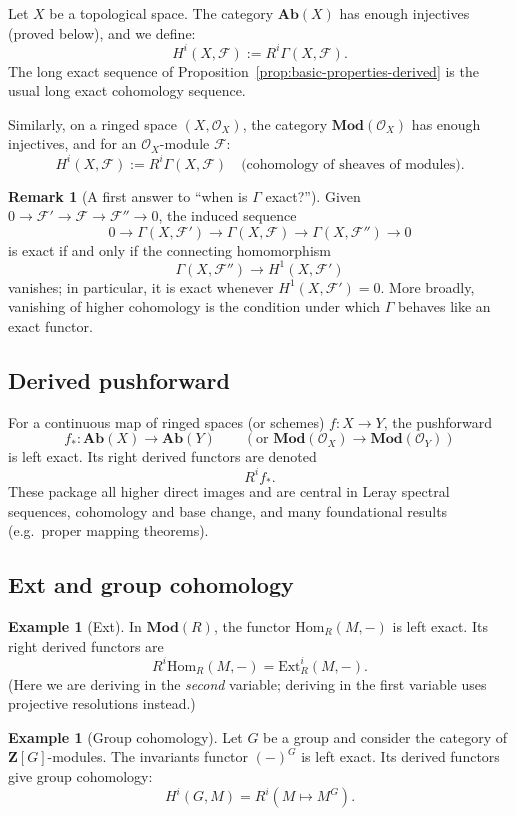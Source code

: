\documentclass[11pt]{article}
\theoremstyle{definition}
\newtheorem{example}[definition]{Example}
\newtheorem{remark}[definition]{Remark}
\theoremstyle{plain}
\newcommand{\Ab}{\mathbf{Ab}}
\newcommand{\Mod}{\mathbf{Mod}}
\newcommand{\Hom}{\mathrm{Hom}}
\newcommand{\Ext}{\mathrm{Ext}}
\newcommand{\OO}{\mathcal{O}}
\newcommand{\ZZ}{\mathbf{Z}}
\begin{document}
Let $X$ be a topological space. The category $\Ab(X)$ has enough injectives (proved below), and we define:
\[
H^i(X,\mathcal{F}) := R^i\Gamma(X,\mathcal{F}).
\]
The long exact sequence of Proposition~\ref{prop:basic-properties-derived} is the usual long exact cohomology sequence.

Similarly, on a ringed space $(X,\OO_X)$, the category $\Mod(\OO_X)$ has enough injectives, and for an $\OO_X$-module $\mathcal{F}$:
\[
H^i(X,\mathcal{F}) := R^i\Gamma(X,\mathcal{F})
\quad\text{(cohomology of sheaves of modules).}
\]

\begin{remark}[A first answer to ``when is $\Gamma$ exact?'']
Given $0\to \mathcal{F}'\to \mathcal{F}\to \mathcal{F}''\to 0$, the induced sequence
\[
0\to \Gamma(X,\mathcal{F}')\to \Gamma(X,\mathcal{F})\to \Gamma(X,\mathcal{F}'')\to 0
\]
is exact if and only if the connecting homomorphism
\[
\Gamma(X,\mathcal{F}'')\longrightarrow H^1(X,\mathcal{F}')
\]
vanishes; in particular, it is exact whenever $H^1(X,\mathcal{F}')=0$.
More broadly, vanishing of higher cohomology is the condition under which $\Gamma$ behaves like an exact functor.
\end{remark}

\subsection{Derived pushforward}

For a continuous map of ringed spaces (or schemes) $f:X\to Y$, the pushforward
\[
f_*:\Ab(X)\to \Ab(Y)\qquad (\text{or }\Mod(\OO_X)\to \Mod(\OO_Y))
\]
is left exact. Its right derived functors are denoted
\[
R^if_*.
\]
These package all higher direct images and are central in Leray spectral sequences, cohomology and base change, and many foundational results (e.g.\ proper mapping theorems).

\subsection{Ext and group cohomology}

\begin{example}[Ext]
In $\Mod(R)$, the functor $\Hom_R(M,-)$ is left exact. Its right derived functors are
\[
R^i\Hom_R(M,-)=\Ext_R^i(M,-).
\]
(Here we are deriving in the \emph{second} variable; deriving in the first variable uses projective resolutions instead.)
\end{example}

\begin{example}[Group cohomology]
Let $G$ be a group and consider the category of $\ZZ[G]$-modules.
The invariants functor $(-)^G$ is left exact. Its derived functors give group cohomology:
\[
H^i(G,M)=R^i(M\mapsto M^G).
\]
\end{example}
\end{document}
